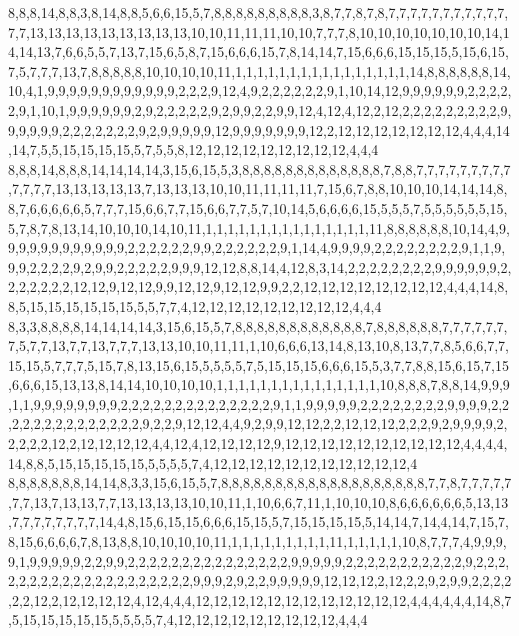 8,8,8,14,8,8,3,8,14,8,8,5,6,6,15,5,7,8,8,8,8,8,8,8,8,8,3,8,7,7,8,7,8,7,7,7,7,7,7,7,7,7,7,7,7,7,13,13,13,13,13,13,13,13,13,10,10,11,11,11,10,10,7,7,7,8,10,10,10,10,10,10,10,14,14,14,13,7,6,6,5,5,7,13,7,15,6,5,8,7,15,6,6,6,15,7,8,14,14,7,15,6,6,6,15,15,15,5,15,6,15,7,5,7,7,7,13,7,8,8,8,8,8,10,10,10,10,11,1,1,1,1,1,1,1,1,1,1,1,1,1,1,1,1,14,8,8,8,8,8,8,14,10,4,1,9,9,9,9,9,9,9,9,9,9,9,9,2,2,2,9,12,4,9,2,2,2,2,2,2,9,1,10,14,12,9,9,9,9,9,9,2,2,2,2,2,9,1,10,1,9,9,9,9,9,9,2,9,2,2,2,2,2,9,2,9,9,2,2,9,9,12,4,12,4,12,2,12,2,2,2,2,2,2,2,2,2,9,9,9,9,9,9,2,2,2,2,2,2,2,9,2,9,9,9,9,9,12,9,9,9,9,9,9,9,12,2,12,12,12,12,12,12,12,4,4,4,14,14,7,5,5,15,15,15,15,5,7,5,5,8,12,12,12,12,12,12,12,12,12,4,4,4
8,8,8,14,8,8,8,14,14,14,14,3,15,6,15,5,3,8,8,8,8,8,8,8,8,8,8,8,8,8,7,8,8,7,7,7,7,7,7,7,7,7,7,7,7,7,13,13,13,13,13,7,13,13,13,10,10,11,11,11,11,7,15,6,7,8,8,10,10,10,14,14,14,8,8,7,6,6,6,6,6,5,7,7,7,15,6,6,7,7,15,6,6,7,7,5,7,10,14,5,6,6,6,6,15,5,5,5,7,5,5,5,5,5,5,15,5,7,8,7,8,13,14,10,10,10,14,10,11,1,1,1,1,1,1,1,1,1,1,1,1,1,1,1,11,8,8,8,8,8,8,10,14,4,9,9,9,9,9,9,9,9,9,9,9,9,2,2,2,2,2,2,9,9,2,2,2,2,2,2,9,1,14,4,9,9,9,9,2,2,2,2,2,2,2,2,9,1,1,9,9,9,2,2,2,2,9,2,9,9,2,2,2,2,2,9,9,9,12,12,8,8,14,4,12,8,3,14,2,2,2,2,2,2,2,2,9,9,9,9,9,9,2,2,2,2,2,2,2,12,12,9,12,12,9,9,12,12,9,12,12,9,9,2,2,12,12,12,12,12,12,12,12,4,4,4,14,8,8,5,15,15,15,15,15,15,5,5,7,7,4,12,12,12,12,12,12,12,12,12,4,4,4
8,3,3,8,8,8,8,14,14,14,14,3,15,6,15,5,7,8,8,8,8,8,8,8,8,8,8,8,8,7,8,8,8,8,8,8,7,7,7,7,7,7,7,5,7,7,13,7,7,13,7,7,7,13,13,10,10,11,11,1,10,6,6,6,13,14,8,13,10,8,13,7,7,8,5,6,6,7,7,15,15,5,7,7,7,5,15,7,8,13,15,6,15,5,5,5,5,7,5,15,15,15,6,6,6,15,5,3,7,7,8,8,15,6,15,7,15,6,6,6,15,13,13,8,14,14,10,10,10,10,1,1,1,1,1,1,1,1,1,1,1,1,1,1,1,10,8,8,8,7,8,8,14,9,9,9,1,1,9,9,9,9,9,9,9,9,2,2,2,2,2,2,2,2,2,2,2,2,2,2,9,1,1,9,9,9,9,9,2,2,2,2,2,2,2,2,9,9,9,9,2,2,2,2,2,2,2,2,2,2,2,2,2,2,9,2,2,9,12,12,4,4,9,2,9,9,12,12,2,2,12,12,12,2,2,2,9,2,9,9,9,9,2,2,2,2,2,12,2,12,12,12,12,4,4,12,4,12,12,12,12,9,12,12,12,12,12,12,12,12,12,12,4,4,4,4,14,8,8,5,15,15,15,15,15,5,5,5,5,7,4,12,12,12,12,12,12,12,12,12,12,12,4
8,8,8,8,8,8,8,14,14,8,3,3,15,6,15,5,7,8,8,8,8,8,8,8,8,8,8,8,8,8,8,8,8,8,8,8,7,7,8,7,7,7,7,7,7,7,13,7,13,13,7,7,13,13,13,13,10,10,11,1,10,6,6,7,11,1,10,10,10,8,6,6,6,6,6,6,5,13,13,7,7,7,7,7,7,7,7,14,4,8,15,6,15,15,6,6,6,15,15,5,7,15,15,15,15,5,14,14,7,14,4,14,7,15,7,8,15,6,6,6,6,7,8,13,8,8,10,10,10,10,11,1,1,1,1,1,1,1,1,1,11,1,1,1,1,1,10,8,7,7,7,4,9,9,9,9,1,9,9,9,9,9,2,2,9,9,2,2,2,2,2,2,2,2,2,2,2,2,2,2,2,9,9,9,9,9,2,2,2,2,2,2,2,2,2,2,2,9,2,2,2,2,2,2,2,2,2,2,2,2,2,2,2,2,2,2,2,2,9,9,9,2,9,2,2,9,9,9,9,9,12,12,12,2,12,2,2,9,2,9,9,2,2,2,2,2,2,12,2,12,12,12,12,4,12,4,4,4,12,12,12,12,12,12,12,12,12,12,12,12,4,4,4,4,4,4,14,8,7,5,15,15,15,15,15,5,5,5,5,7,4,12,12,12,12,12,12,12,12,12,4,4,4
